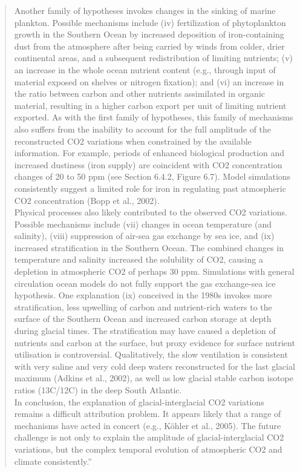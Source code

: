 \begin{quotation}
	Another family of hypotheses invokes changes in the sinking of marine plankton. Possible mechanisms include (iv) fertilization of phytoplankton growth in the Southern Ocean by increased deposition of iron-containing dust from the atmosphere after being carried by winds from colder, drier continental areas, and a subsequent redistribution of limiting nutrients; (v) an increase in the whole ocean nutrient content (e.g., through input of material exposed on shelves or nitrogen fixation); and (vi) an increase in the ratio between carbon and other nutrients assimilated in organic material, resulting in a higher carbon export per unit of limiting nutrient exported. As with the first family of hypotheses, this family of mechanisms also suffers from the inability to account for the full amplitude of the reconstructed CO2 variations when constrained by the available information. For example, periods of enhanced biological production and increased dustiness (iron supply) are coincident with CO2 concentration changes of 20 to 50 ppm (see Section 6.4.2, Figure 6.7). Model simulations consistently suggest a limited role for iron in regulating past atmospheric CO2 concentration (Bopp et al., 2002).\\
	Physical processes also likely contributed to the observed CO2 variations. Possible mechanisms include (vii) changes in ocean temperature (and salinity), (viii) suppression of air-sea gas exchange by sea ice, and (ix) increased stratification in the Southern Ocean. The combined changes in temperature and salinity increased the solubility of CO2, causing a depletion in atmospheric CO2 of perhaps 30 ppm. Simulations with general circulation ocean models do not fully support the gas exchange-sea ice hypothesis. One explanation (ix) conceived in the 1980s invokes more stratification, less upwelling of carbon and nutrient-rich waters to the surface of the Southern Ocean and increased carbon storage at depth during glacial times. The stratification may have caused a depletion of nutrients and carbon at the surface, but proxy evidence for surface nutrient utilisation is controversial. Qualitatively, the slow ventilation is consistent with very saline and very cold deep waters reconstructed for the last glacial maximum (Adkins et al., 2002), as well as low glacial stable carbon isotope ratios (13C/12C) in the deep South Atlantic.\\
	In conclusion, the explanation of glacial-interglacial CO2 variations remains a difficult attribution problem. It appears likely that a range of mechanisms have acted in concert (e.g., K\"ohler et al., 2005). The future challenge is not only to explain the amplitude of glacial-interglacial CO2 variations, but the complex temporal evolution of atmospheric CO2 and climate consistently.''
\end{quotation}

